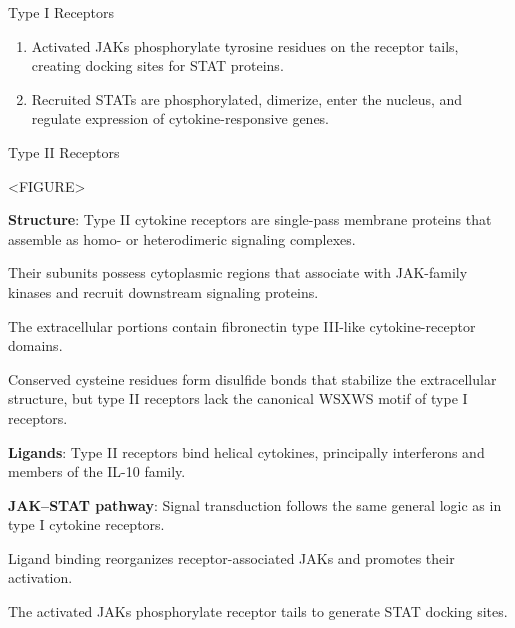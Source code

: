 \begin{core}{Type I Receptors}
\begin{enumerate}[label=(\arabic*)]
        \item Activated JAKs phosphorylate tyrosine residues on the receptor tails, creating docking sites for STAT proteins.

        \item Recruited STATs are phosphorylated, dimerize, enter the nucleus, and regulate expression of cytokine-responsive genes.

      \end{enumerate}

    \end{core}

    \begin{core}{Type II Receptors}

      <FIGURE>

      \textbf{Structure}: Type II cytokine receptors are single-pass membrane proteins that assemble as homo- or heterodimeric signaling complexes.

      Their subunits possess cytoplasmic regions that associate with JAK-family kinases and recruit downstream signaling proteins.

      The extracellular portions contain fibronectin type III-like cytokine-receptor domains.

      Conserved cysteine residues form disulfide bonds that stabilize the extracellular structure, but type II receptors lack the canonical WSXWS motif of type I receptors.

      \textbf{Ligands}: Type II receptors bind helical cytokines, principally interferons and members of the IL-10 family.

      \textbf{JAK--STAT pathway}: Signal transduction follows the same general logic as in type I cytokine receptors.

      Ligand binding reorganizes receptor-associated JAKs and promotes their activation.

      The activated JAKs phosphorylate receptor tails to generate STAT docking sites.


\end{core}
